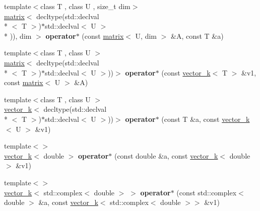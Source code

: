 \begin{DoxyCompactItemize}
\item 
\hypertarget{namespacekeycpp_a650b89b71e7516e560bb2be49b30aedd}{{\footnotesize template$<$class T , class U , size\-\_\-t dim$>$ }\\\hyperlink{classkeycpp_1_1matrix}{matrix}$<$ decltype(std\-::declval\\*
$<$ T $>$)$\ast$std\-::declval$<$ U $>$\\*
)), dim $>$ {\bfseries operator$\ast$} (const \hyperlink{classkeycpp_1_1matrix}{matrix}$<$ U, dim $>$ \&A, const T \&a)}\label{namespacekeycpp_a650b89b71e7516e560bb2be49b30aedd}

\item 
\hypertarget{namespacekeycpp_a7a43db361f4a3128d89ad6a1db86686c}{{\footnotesize template$<$class T , class U $>$ }\\\hyperlink{classkeycpp_1_1matrix}{matrix}$<$ decltype(std\-::declval\\*
$<$ T $>$)$\ast$std\-::declval$<$ U $>$))$>$ {\bfseries operator$\ast$} (const \hyperlink{classkeycpp_1_1vector__k}{vector\-\_\-k}$<$ T $>$ \&v1, const \hyperlink{classkeycpp_1_1matrix}{matrix}$<$ U $>$ \&A)}\label{namespacekeycpp_a7a43db361f4a3128d89ad6a1db86686c}

\item 
\hypertarget{namespacekeycpp_a6e4d2d791a5cbcbcf90de5da2250b4c8}{{\footnotesize template$<$class T , class U $>$ }\\\hyperlink{classkeycpp_1_1vector__k}{vector\-\_\-k}$<$ decltype(std\-::declval\\*
$<$ T $>$)$\ast$std\-::declval$<$ U $>$))$>$ {\bfseries operator$\ast$} (const T \&a, const \hyperlink{classkeycpp_1_1vector__k}{vector\-\_\-k}$<$ U $>$ \&v1)}\label{namespacekeycpp_a6e4d2d791a5cbcbcf90de5da2250b4c8}

\item 
\hypertarget{namespacekeycpp_ac7a042d0e04e0c610b5798017c8196d9}{{\footnotesize template$<$$>$ }\\\hyperlink{classkeycpp_1_1vector__k}{vector\-\_\-k}$<$ double $>$ {\bfseries operator$\ast$} (const double \&a, const \hyperlink{classkeycpp_1_1vector__k}{vector\-\_\-k}$<$ double $>$ \&v1)}\label{namespacekeycpp_ac7a042d0e04e0c610b5798017c8196d9}

\item 
\hypertarget{namespacekeycpp_a06de45116e1111f3aca66cd18565e9ba}{{\footnotesize template$<$$>$ }\\\hyperlink{classkeycpp_1_1vector__k}{vector\-\_\-k}$<$ std\-::complex$<$ double $>$ $>$ {\bfseries operator$\ast$} (const std\-::complex$<$ double $>$ \&a, const \hyperlink{classkeycpp_1_1vector__k}{vector\-\_\-k}$<$ std\-::complex$<$ double $>$$>$ \&v1)}\label{namespacekeycpp_a06de45116e1111f3aca66cd18565e9ba}


\end{DoxyCompactItemize}
